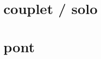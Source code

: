 \songbooksongstruct

\newpage
\begin{multicols}{2}
	\xxxlyrics
\end{multicols}
\newpage

\section*{couplet / solo}

\section*{pont}
